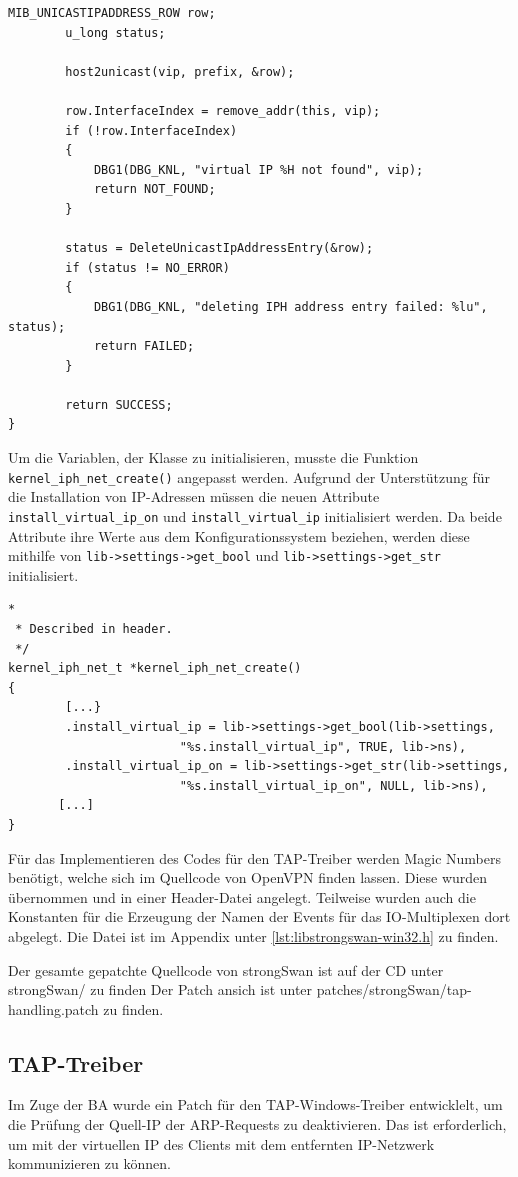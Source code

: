 {\begin{lstlisting}[caption=Code für del\_ip,label=lst:kernel_iph_del_ip]
        MIB_UNICASTIPADDRESS_ROW row;
        u_long status;

        host2unicast(vip, prefix, &row);

        row.InterfaceIndex = remove_addr(this, vip);
        if (!row.InterfaceIndex)
        {
            DBG1(DBG_KNL, "virtual IP %H not found", vip);
            return NOT_FOUND;
        }

        status = DeleteUnicastIpAddressEntry(&row);
        if (status != NO_ERROR)
        {
            DBG1(DBG_KNL, "deleting IPH address entry failed: %lu", status);
            return FAILED;
        }

        return SUCCESS;
}
\end{lstlisting}

Um die Variablen, der Klasse zu initialisieren, musste die Funktion \texttt{kernel\_iph\_net\_create()}
angepasst werden. Aufgrund der Unterstützung für die Installation von \ac{IP}-Adressen
müssen die neuen Attribute \texttt{install\_virtual\_ip\_on} und \texttt{install\_virtual\_ip}
initialisiert werden. Da beide Attribute ihre Werte aus dem Konfigurationssystem
beziehen, werden diese mithilfe von \texttt{lib->settings->get\_bool} und \texttt{lib->settings->get\_str} initialisiert.

\begin{lstlisting}[caption=Ergänzung zu kernel\_iph\_net\_create(),label=lst:kernel_iph_create]
*
 * Described in header.
 */
kernel_iph_net_t *kernel_iph_net_create()
{
        [...}
        .install_virtual_ip = lib->settings->get_bool(lib->settings,
                        "%s.install_virtual_ip", TRUE, lib->ns),
        .install_virtual_ip_on = lib->settings->get_str(lib->settings,
                        "%s.install_virtual_ip_on", NULL, lib->ns),
       [...]
}
\end{lstlisting}

Für das Implementieren des Codes für den TAP-Treiber werden Magic Numbers benötigt,
welche sich im Quellcode von OpenVPN finden lassen. Diese wurden übernommen
und in einer Header-Datei angelegt.
Teilweise wurden auch die Konstanten für die Erzeugung der Namen der Events für
das IO-Multiplexen dort abgelegt. Die Datei ist im Appendix unter \autoref{lst:libstrongswan-win32.h}
zu finden.

Der gesamte gepatchte Quellcode von strongSwan ist auf der CD unter strongSwan/ zu finden
Der Patch ansich ist unter patches/strongSwan/tap-handling.patch zu finden.

\subsection{TAP-Treiber}
Im Zuge der \ac{BA} wurde ein Patch für den TAP-Windows-Treiber entwicklelt, um die
Prüfung der Quell-IP der ARP-Requests zu deaktivieren. Das ist erforderlich, um mit der
virtuellen IP des Clients mit dem entfernten IP-Netzwerk kommunizieren zu können.


}
